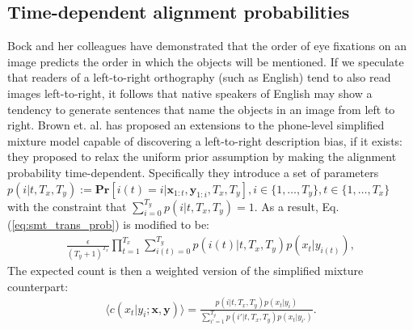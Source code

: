 \documentclass[journal]{IEEEtran}
\begin{document}
\subsection{Time-dependent alignment probabilities}
Bock and her colleagues \cite{Bock03} have demonstrated that the order of eye fixations on an image predicts the order in which the objects will be mentioned. If we speculate that readers of a left-to-right orthography (such as English) tend to also read images left-to-right, it follows that native speakers of English may show a tendency to generate sentences that name the objects in an image from left to right. Brown et. al. \cite{Brown92} has proposed an extensions to the phone-level simplified mixture model capable of discovering a left-to-right description bias, if it exists: they proposed to relax the uniform prior assumption by making the alignment probability time-dependent. Specifically they introduce a set of parameters $p(i|t, T_x, T_y) := \mathbf{Pr}[i(t) = i|\mathbf x_{1:t}, \mathbf y_{1:i}, T_x, T_y], i\in \{1,\ldots,T_y\}, t\in \{1,\ldots,T_x\}$ with the constraint that $\sum_{i=0}^{T_y} p(i|t, T_x, T_y) = 1$. As a result, Eq. (\ref{eq:smt_trans_prob}) is modified to be:
\begin{align}
    \frac{\epsilon}{(T_y+1)^{T_x}}\prod_{t=1}^{T_x} \sum_{i(t)=0}^{T_y}p(i(t)|t, T_x, T_y) p(x_t|y_{i(t)}),
\end{align}
The expected count is then a weighted version of the simplified mixture counterpart:
\begin{align}
\label{eq:expected_count_ibm2}
    \langle c(x_t|y_i; \mathbf x, \mathbf y) \rangle = \frac{p(i|t, T_x, T_y) p(x_t|y_i)}{\sum_{i'=1}^{T_y}p(i'|t, T_x, T_y) p(x_t|y_{i'})}.
\end{align}

\end{document}

